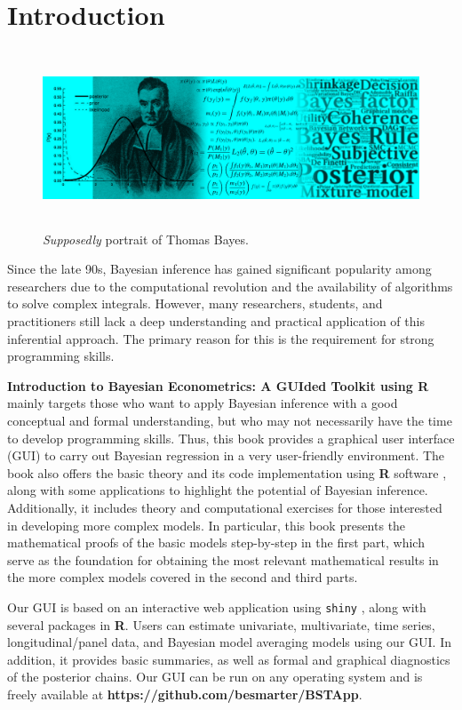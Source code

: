 \chapter*{Introduction}
\begin{figure}[h]
	\includegraphics[width=340pt, height=150pt]{frontmatter/figures/BannerBook.jpg}
	\caption[List of figure caption goes here]{\textit{Supposedly} portrait of Thomas Bayes.}\label{fig01}
\end{figure}

Since the late 90s, Bayesian inference has gained significant popularity among researchers due to the computational revolution and the availability of algorithms to solve complex integrals. However, many researchers, students, and practitioners still lack a deep understanding and practical application of this inferential approach. The primary reason for this is the requirement for strong programming skills.


\textbf{Introduction to Bayesian Econometrics: A GUIded Toolkit using R} mainly targets those who want to apply Bayesian inference with a good conceptual and formal understanding, but who may not necessarily have the time to develop programming skills. Thus, this book provides a graphical user interface (GUI) to carry out Bayesian regression in a very user-friendly environment. The book also offers the basic theory and its code implementation using \textbf{R} software \cite{R2021}, along with some applications to highlight the potential of Bayesian inference. Additionally, it includes theory and computational exercises for those interested in developing more complex models. In particular, this book presents the mathematical proofs of the basic models step-by-step in the first part, which serve as the foundation for obtaining the most relevant mathematical results in the more complex models covered in the second and third parts.

Our GUI is based on an interactive web application using \texttt{shiny} \cite{Chang2018}, along with several packages in \textbf{R}. Users can estimate univariate, multivariate, time series, longitudinal/panel data, and Bayesian model averaging models using our GUI. In addition, it provides basic summaries, as well as formal and graphical diagnostics of the posterior chains. Our GUI can be run on any operating system and is freely available at \textbf{https://github.com/besmarter/BSTApp}.

